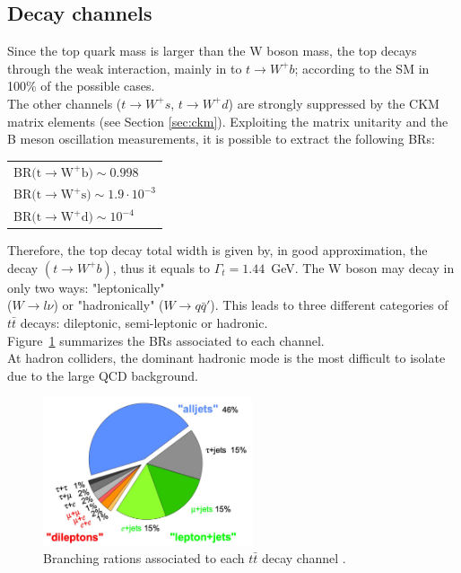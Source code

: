 \subsection{Decay channels}
Since the top quark mass is larger than the W boson mass, the top decays through the weak interaction, mainly in to $t\rightarrow W^{+}b$; according to the SM in 100\% of the possible cases.\\
The other channels ($t\rightarrow W^{+}s$, $t\rightarrow W^{+}d$) are strongly suppressed by the CKM matrix elements (see Section \ref{sec:ckm}). Exploiting the matrix unitarity 
and the B meson oscillation measurements, it is possible to extract the following BRs\cite{tdecayBR}:
\begin{table}[!ht]
	\centering
	\begin{tabular}{l}
		BR$(\mathrm{t \rightarrow W^{+} b)\sim 0.998}$\\
		BR$(\mathrm{t \rightarrow W^{+} s)\sim 1.9\cdot10^{-3}}$\\
		BR$(\mathrm{t \rightarrow W^{+} d)\sim 10^{-4}}$\\
	\end{tabular}
\end{table}
\newline Therefore, the top decay total width is given by, in good approximation, the decay $(t \rightarrow W^{+} b)$, thus it equals to $\Gamma_t = 1.44$~GeV.
The W boson may decay in only two ways: "leptonically" \\($W\rightarrow l\nu$) or "hadronically" ($W\rightarrow q\bar{q}'$). This leads to three different categories
of $t\bar{t}$ decays: dileptonic, semi-leptonic or hadronic.\\ Figure~\ref{fig:ttBR} summarizes the BRs associated to each channel.\\
At hadron colliders, the dominant hadronic mode is the most difficult to isolate due to the large QCD background.
\begin{figure}[!h]
	\centering
	\includegraphics[width=0.55\textwidth]{Chapters/CH1/figures/ttBR}
	\caption{Branching rations associated to each $t\bar{t}$ decay channel \cite{ttdecayBR}.}
	\label{fig:ttBR}
\end{figure}


